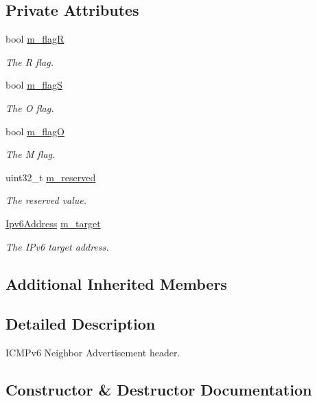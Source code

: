 \subsection*{Private Attributes}
\begin{DoxyCompactItemize}
\item 
bool \hyperlink{classns3_1_1Icmpv6NA_aba3ddf05ea11b9194bb0484299b91641}{m\+\_\+flagR}
\begin{DoxyCompactList}\small\item\em The R flag. \end{DoxyCompactList}\item 
bool \hyperlink{classns3_1_1Icmpv6NA_a1d117fa8aa4cb770bfc887bbf06e1b43}{m\+\_\+flagS}
\begin{DoxyCompactList}\small\item\em The O flag. \end{DoxyCompactList}\item 
bool \hyperlink{classns3_1_1Icmpv6NA_af69a1b4d2babd021e6d6121cea6ea853}{m\+\_\+flagO}
\begin{DoxyCompactList}\small\item\em The M flag. \end{DoxyCompactList}\item 
uint32\+\_\+t \hyperlink{classns3_1_1Icmpv6NA_a2ae5c4f93f08343b1bd1bf12879ad39b}{m\+\_\+reserved}
\begin{DoxyCompactList}\small\item\em The reserved value. \end{DoxyCompactList}\item 
\hyperlink{classns3_1_1Ipv6Address}{Ipv6\+Address} \hyperlink{classns3_1_1Icmpv6NA_ad37f044bb91453c07425db84e6bcedb6}{m\+\_\+target}
\begin{DoxyCompactList}\small\item\em The I\+Pv6 target address. \end{DoxyCompactList}\end{DoxyCompactItemize}
\subsection*{Additional Inherited Members}


\subsection{Detailed Description}
I\+C\+M\+Pv6 Neighbor Advertisement header. 

\subsection{Constructor \& Destructor Documentation}
